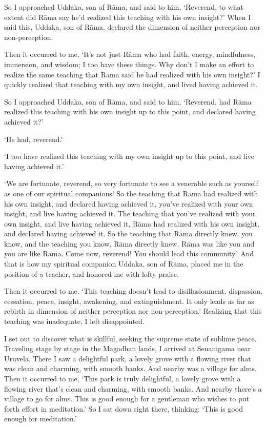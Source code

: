 \documentclass[12pt,openany]{book}%
\begin{document}
So I approached Uddaka, son of \textsanskrit{Rāma}, and said to him, ‘Reverend, to what extent did \textsanskrit{Rāma} say he’d realized this teaching with his own insight?’ When I said this, Uddaka, son of \textsanskrit{Rāma}, declared the dimension of neither perception nor non-perception. 

Then it occurred to me, ‘It’s not just \textsanskrit{Rāma} who had faith, energy, mindfulness, immersion, and wisdom; I too have these things. Why don’t I make an effort to realize the same teaching that \textsanskrit{Rāma} said he had realized with his own insight?’ I quickly realized that teaching with my own insight, and lived having achieved it. 

So I approached Uddaka, son of \textsanskrit{Rāma}, and said to him, ‘Reverend, had \textsanskrit{Rāma} realized this teaching with his own insight up to this point, and declared having achieved it?’ 

‘He had, reverend.’ 

‘I too have realized this teaching with my own insight up to this point, and live having achieved it.’ 

‘We are fortunate, reverend, so very fortunate to see a venerable such as yourself as one of our spiritual companions! So the teaching that \textsanskrit{Rāma} had realized with his own insight, and declared having achieved it, you’ve realized with your own insight, and live having achieved it. The teaching that you’ve realized with your own insight, and live having achieved it, \textsanskrit{Rāma} had realized with his own insight, and declared having achieved it. So the teaching that \textsanskrit{Rāma} directly knew, you know, and the teaching you know, \textsanskrit{Rāma} directly knew. \textsanskrit{Rāma} was like you and you are like \textsanskrit{Rāma}. Come now, reverend! You should lead this community.’ And that is how my spiritual companion Uddaka, son of \textsanskrit{Rāma}, placed me in the position of a teacher, and honored me with lofty praise. 

Then it occurred to me, ‘This teaching doesn’t lead to disillusionment, dispassion, cessation, peace, insight, awakening, and extinguishment. It only leads as far as rebirth in dimension of neither perception nor non-perception.’ Realizing that this teaching was inadequate, I left disappointed. 

I set out to discover what is skillful, seeking the supreme state of sublime peace. Traveling stage by stage in the Magadhan lands, I arrived at Senanigama near \textsanskrit{Uruvelā}. There I saw a delightful park, a lovely grove with a flowing river that was clean and charming, with smooth banks. And nearby was a village for alms. Then it occurred to me, ‘This park is truly delightful, a lovely grove with a flowing river that’s clean and charming, with smooth banks. And nearby there’s a village to go for alms. This is good enough for a gentleman who wishes to put forth effort in meditation.’ So I sat down right there, thinking: ‘This is good enough for meditation.’ 
\end{document}
